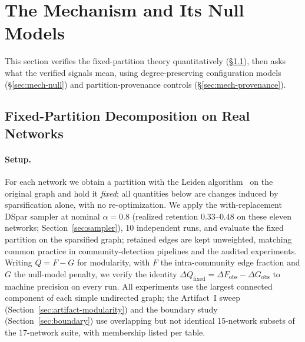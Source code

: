 \documentclass[10pt,journal,compsoc]{IEEEtran}
\begin{document}
\section{The Mechanism and Its Null Models}
\label{sec:mechanism}

This section verifies the fixed-partition theory quantitatively (\S\ref{sec:mech-verify}), then asks what the verified signals mean, using degree-preserving configuration models (\S\ref{sec:mech-null}) and partition-provenance controls (\S\ref{sec:mech-provenance}).

\subsection{Fixed-Partition Decomposition on Real Networks}
\label{sec:mech-verify}

\paragraph{Setup.}
For each network we obtain a partition with the Leiden algorithm~\cite{traag2019louvain} on the original graph and hold it \emph{fixed}; all quantities below are changes induced by sparsification alone, with no re-optimization.
We apply the with-replacement DSpar sampler at nominal $\alpha = 0.8$ (realized retention $0.33$--$0.48$ on these eleven networks; Section~\ref{sec:sampler}), 10 independent runs, and evaluate the fixed partition on the sparsified graph; retained edges are kept unweighted, matching common practice in community-detection pipelines and the audited experiments.
Writing $Q = F - G$ for modularity, with $F$ the intra-community edge fraction and $G$ the null-model penalty, we verify the identity $\Delta Q_{\mathrm{fixed}} = \Delta F_{\mathrm{obs}} - \Delta G_{\mathrm{obs}}$ to machine precision on every run.
All experiments use the largest connected component of each simple undirected graph; the Artifact~I sweep (Section~\ref{sec:artifact-modularity}) and the boundary study (Section~\ref{sec:boundary}) use overlapping but not identical 15-network subsets of the 17-network suite, with membership listed per table.




\end{document}
